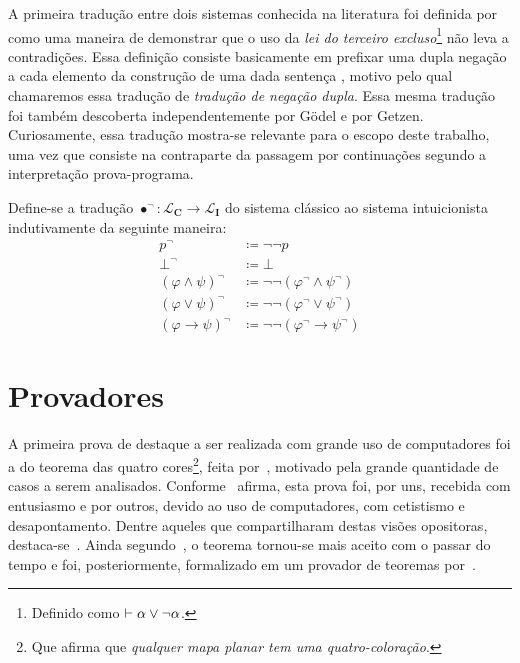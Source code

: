 A primeira tradução entre dois sistemas conhecida na literatura foi definida por~\cite{Kolmogorov} como uma maneira de demonstrar que o uso da \emph{lei do terceiro excluso}\footnote{Definido como $\mathrel{\vdash}\alpha\vee\neg\alpha$.} não leva a contradições. Essa definição consiste basicamente em prefixar uma dupla negação a cada elemento da construção de uma dada sentença \citep{Coniglio}, motivo pelo qual chamaremos essa tradução de \emph{tradução de negação dupla}. Essa mesma tradução foi também descoberta independentemente por Gödel e por Getzen. Curiosamente, essa tradução mostra-se relevante para o escopo deste trabalho, uma vez que consiste na contraparte da passagem por continuações segundo a interpretação prova-programa.

\begin{example} Define-se a tradução $\bullet^\neg:\mathcal{L}_\mathbf{C}\to\mathcal{L}_\mathbf{I}$ do sistema clássico ao sistema intuicionista indutivamente da seguinte maneira:
    \begin{align*}
        p^\neg&\coloneqq\neg\neg p\\
        \bot^\neg&\coloneqq\bot\\
        {(\varphi\wedge\psi)}^\neg&\coloneqq\neg\neg(\varphi^\neg \wedge \psi^\neg)\\
        {(\varphi\vee\psi)}^\neg&\coloneqq\neg\neg (\varphi^\neg \vee \psi^\neg)\\
        {(\varphi\to\psi)}^\neg&\coloneqq\neg\neg (\varphi^\neg \to \psi^\neg)
        \tag*{\qed} 
    \end{align*}
\end{example}

\section{Provadores}

A primeira prova de destaque a ser realizada com grande uso de computadores foi a do teorema das quatro cores\footnote{Que afirma que \emph{qualquer mapa planar tem uma quatro-coloração}.}, feita por~\cite{Appel}, motivado pela grande quantidade de casos a serem analisados. Conforme~\cite{Wilson} afirma, esta prova foi, por uns, recebida com entusiasmo e por outros, devido ao uso de computadores, com cetistismo e desapontamento. Dentre aqueles que compartilharam destas visões opositoras, destaca-se~\cite{Tymoczko}. Ainda segundo~\cite{Wilson}, o teorema tornou-se mais aceito com o passar do tempo e foi, posteriormente, formalizado em um provador de teoremas por~\cite{Gonthier}.

